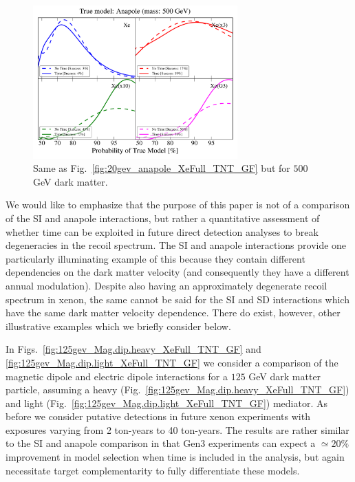 \documentclass[11pt]{article}
\newcommand{\Fig}[1]{Fig.~\ref{#1}} \newcommand{\Figs}[2]{Figs.~\ref{#1} and \ref{#2}}
\begin{document}
\begin{figure}
\centering
\includegraphics[width=0.7\textwidth]{plots/PDF_500GeV_Anapole_50sims_Xe_Xe3x_Xe10x_XeG3_GF_TNT.pdf}
\caption{\label{fig:500gev_anapole_XeFull_TNT_GF}
Same as Fig.~\ref{fig:20gev_anapole_XeFull_TNT_GF} but for $500$ GeV dark matter.}
\end{figure}

We would like to emphasize that the purpose of this paper is not of a comparison of the SI and anapole interactions, but rather a quantitative assessment of whether time can be exploited in future direct detection analyses to break degeneracies in the recoil spectrum. The SI and anapole interactions provide one particularly illuminating example of this because they contain different dependencies on the dark matter velocity (and consequently they have a different annual modulation). Despite also having an approximately degenerate recoil spectrum in xenon, the same cannot be said for the SI and SD interactions which have the same dark matter velocity dependence. There do exist, however, other illustrative examples which we briefly consider below.

In \Figs{fig:125gev_Mag.dip.heavy_XeFull_TNT_GF}{fig:125gev_Mag.dip.light_XeFull_TNT_GF} we consider a comparison of the magnetic dipole and electric dipole interactions for a $125$ GeV dark matter particle, assuming a heavy (\Fig{fig:125gev_Mag.dip.heavy_XeFull_TNT_GF}) and light (\Fig{fig:125gev_Mag.dip.light_XeFull_TNT_GF}) mediator. As before we consider putative detections in future xenon experiments with exposures varying from 2 ton-years to 40 ton-years. The results are rather similar to the SI and anapole comparison in that Gen3 experiments can expect a $\simeq 20\%$ improvement in model selection when time is included in the analysis, but again necessitate target complementarity to fully differentiate these models.
\end{document}
